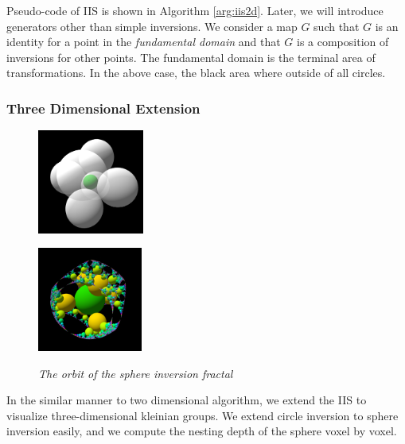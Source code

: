 Pseudo-code of IIS is shown in Algorithm \ref{arg:iis2d}.
Later, we will introduce generators other than simple inversions.
We consider a map $G$ such that $G$ is an identity for a point in the
\textit{fundamental domain} and that $G$ is a composition of inversions for other
points.
The fundamental domain is the terminal area of transformations. 
In the above case, the black area where outside of all circles.

\subsubsection{Three Dimensional Extension}

\begin{figure}[htbp]
 \begin{minipage}[t]{0.5\hsize}
  \center
  \includegraphics[height=1.35in, keepaspectratio]{img/preparation/3dExtension/3dKissingGenerator.png}
  \label{fig:simpleGen}
  \hspace*{\fill}
 \end{minipage}
 \begin{minipage}[t]{0.5\hsize}
  \center
  \includegraphics[height=1.35in, keepaspectratio]{img/preparation/3dExtension/3dOrbit.png}
  \label{fig:simpleOrb}
  \hspace*{\fill}
 \end{minipage}
 \caption{\textit{The orbit of the sphere inversion fractal}}
 \label{fig:simpleGenOrb}
\end{figure}

In the similar manner to two dimensional algorithm,
we extend the IIS to visualize three-dimensional kleinian groups.
We extend circle inversion to sphere inversion easily, and we
compute the nesting depth of the sphere voxel by voxel.

